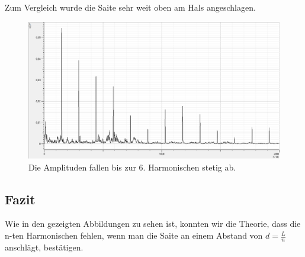 \documentclass[12pt,a4paper]{article}
\begin{document}
Zum Vergleich wurde die Saite sehr weit oben am Hals angeschlagen.
\begin{figure}[H]
\centering
\includegraphics[scale=0.45]{Bilder/Spektrum_oben.png}
\caption{Die Amplituden fallen bis zur 6. Harmonischen stetig ab.}
\end{figure}

\subsection{Fazit}
Wie in den gezeigten Abbildungen zu sehen ist, konnten wir die Theorie, dass die n-ten Harmonischen fehlen, wenn man die Saite an einem Abstand von $d=\frac{L}{n}$ anschlägt, bestätigen.
\end{document}
